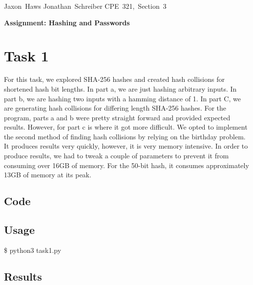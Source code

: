 \documentclass[11pt]{article}
\begin{document}
\hfill\vbox{\hbox{Jaxon Haws}
		\hbox{Jonathan Schreiber}	
		\hbox{CPE 321, Section 3}}\par

\bigskip
\centerline{\Large\bf Assignment: Hashing and Passwords}\par
\bigskip

\section{Task 1}

  For this task, we explored SHA-256 hashes and created hash collisions
  for shortened hash bit lengths. In part a, we are just hashing arbitrary
  inputs. In part b, we are hashing two inputs with a hamming distance of 1. 
  In part C, we are generating hash collisions for differing length SHA-256 
  hashes. For the program, parts a and b were pretty straight forward and 
  provided expected results. However, for part c is where it got more difficult. 
  We opted to implement the second method of finding hash collisions by relying 
  on the birthday problem. It produces results very quickly, however, it 
  is very memory intensive. In order to produce results, we had to tweak a couple 
  of parameters to prevent it from consuming over 16GB of memory. For the 
  50-bit hash, it consumes approximately 13GB of memory at its peak.

  \subsection{Code}
    

  \subsection{Usage}
   
    {\tt\begin{tabbing}                                                                                                                                                                     
       \$ python3 task1.py\\
      \end{tabbing}}

  \subsection{Results}
    
\end{document}
